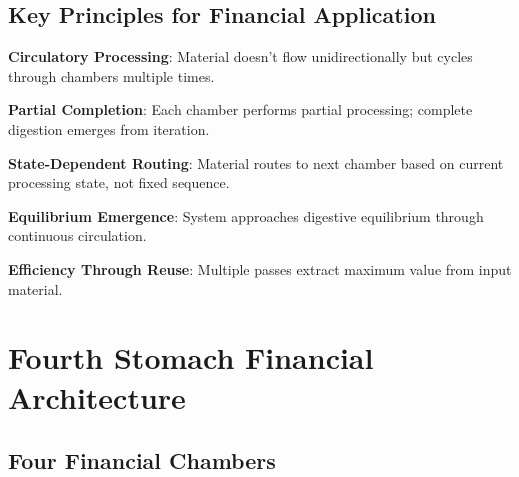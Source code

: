 \documentclass[12pt]{article}
\begin{document}
\subsection{Key Principles for Financial Application}

\textbf{Circulatory Processing}: Material doesn't flow unidirectionally but cycles through chambers multiple times.

\textbf{Partial Completion}: Each chamber performs partial processing; complete digestion emerges from iteration.

\textbf{State-Dependent Routing}: Material routes to next chamber based on current processing state, not fixed sequence.

\textbf{Equilibrium Emergence}: System approaches digestive equilibrium through continuous circulation.

\textbf{Efficiency Through Reuse}: Multiple passes extract maximum value from input material.

\section{Fourth Stomach Financial Architecture}

\subsection{Four Financial Chambers}
\end{document}
